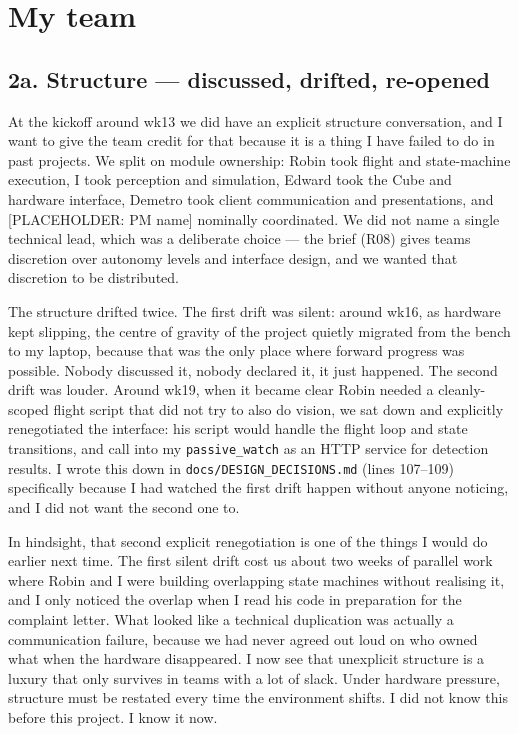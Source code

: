 \section{My team}

\subsection*{2a. Structure --- discussed, drifted, re-opened}

At the kickoff around wk13 we did have an explicit structure conversation, and I want to give the team credit for that because it is a thing I have failed to do in past projects. We split on module ownership: Robin took flight and state-machine execution, I took perception and simulation, Edward took the Cube and hardware interface, Demetro took client communication and presentations, and [PLACEHOLDER: PM name] nominally coordinated. We did not name a single technical lead, which was a deliberate choice --- the brief (R08) gives teams discretion over autonomy levels and interface design, and we wanted that discretion to be distributed.

The structure drifted twice. The first drift was silent: around wk16, as hardware kept slipping, the centre of gravity of the project quietly migrated from the bench to my laptop, because that was the only place where forward progress was possible. Nobody discussed it, nobody declared it, it just happened. The second drift was louder. Around wk19, when it became clear Robin needed a cleanly-scoped flight script that did not try to also do vision, we sat down and explicitly renegotiated the interface: his script would handle the flight loop and state transitions, and call into my \texttt{passive\_watch} as an HTTP service for detection results. I wrote this down in \texttt{docs/DESIGN\_DECISIONS.md} (lines 107--109) specifically because I had watched the first drift happen without anyone noticing, and I did not want the second one to.

In hindsight, that second explicit renegotiation is one of the things I would do earlier next time. The first silent drift cost us about two weeks of parallel work where Robin and I were building overlapping state machines without realising it, and I only noticed the overlap when I read his code in preparation for the complaint letter. What looked like a technical duplication was actually a communication failure, because we had never agreed out loud on who owned what when the hardware disappeared. I now see that unexplicit structure is a luxury that only survives in teams with a lot of slack. Under hardware pressure, structure must be restated every time the environment shifts. I did not know this before this project. I know it now.

